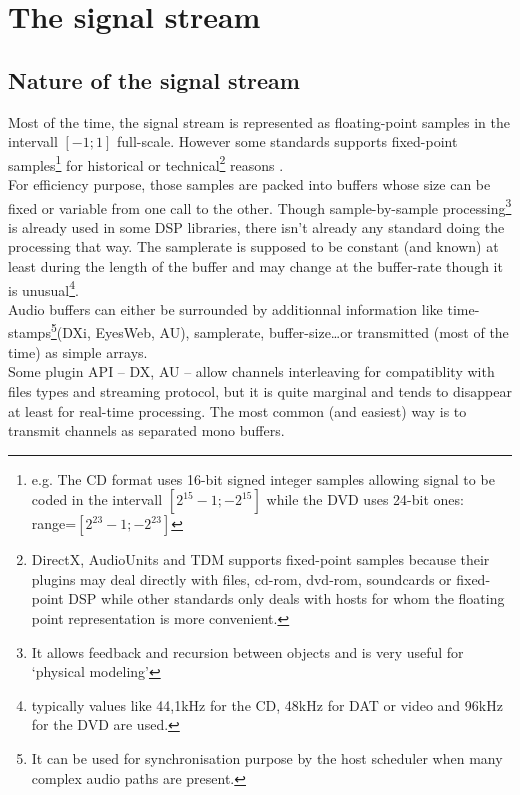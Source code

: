 
\chapter{The signal stream}



\section{Nature of the signal stream}

\noindent Most of the time, the signal stream is represented as floating-point samples in the intervall $[-1;1]$ full-scale. However some standards supports fixed-point samples\footnote{e.g. The CD format uses 16-bit signed integer samples allowing signal to be coded in the intervall $[2^{15}-1;-2^{15}]$ while the DVD uses 24-bit ones: range=$[2^{23}-1;-2^{23}]$} for historical or technical\footnote{DirectX, AudioUnits and TDM supports fixed-point samples because their plugins may deal directly with files, cd-rom, dvd-rom, soundcards or fixed-point DSP while other standards only deals with hosts for whom the floating point representation is more convenient.} reasons .\\
For efficiency purpose, those samples are packed into buffers whose size can be fixed or variable from one call to the other. Though sample-by-sample processing\footnote{It allows feedback and recursion between objects and is very useful for `physical modeling'} is already used in some DSP libraries, there isn't already any standard doing the processing that way. The samplerate is supposed to be constant (and known) at least during the length of the buffer and may change at the buffer-rate though it is unusual\footnote{typically values like 44,1kHz for the CD, 48kHz for DAT or video and 96kHz for the DVD are used.}.\\
Audio buffers can either be surrounded by additionnal information like time-stamps\footnote{It can be used for synchronisation purpose by the host scheduler when many complex audio paths are present.}(DXi, EyesWeb, AU), samplerate, buffer-size\ldots  or transmitted (most of the time) as simple arrays.\\ %
Some plugin API -- DX, AU -- allow channels interleaving for compatiblity with files types and streaming protocol, but it is quite marginal and tends to disappear at least for real-time processing. The most common (and easiest) way is to transmit channels as separated mono buffers.



